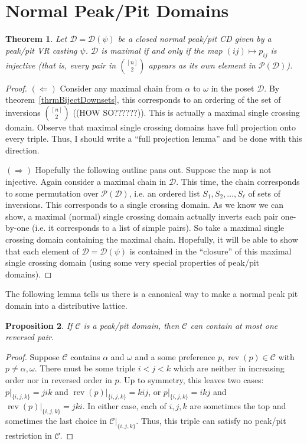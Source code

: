 \documentclass[12pt]{article}
\newtheorem{theorem}{Theorem}
\newtheorem{proposition}[theorem]{Proposition}
\newcommand{\C}{\mathcal{C}}
\newcommand{\D}{\mathcal{D}}
\newcommand{\PP}{\mathcal{P}}
\DeclareMathOperator*{\rev}{rev}
\newcommand{\1}[1]{\mathds{1}[{#1}]}
\begin{document}
\section{Normal Peak/Pit Domains}
  \begin{theorem}
    Let $\D = \D(\psi)$ be a closed normal peak/pit CD
    given by a peak/pit VR casting $\psi$.
    $\D$ is maximal if and only if the map $(ij)\mapsto p_{ij}$
    is injective (that is, every pair in $[n]\choose 2$ appears as
    its own element in $\PP(\D)$).
  \end{theorem}
  \begin{proof}
    $(\Longleftarrow)$ Consider any maximal chain from $\alpha$ to
    $\omega$ in the poset $\D$. By theorem~\ref{thrmBijectDownsets},
    this corresponds to an ordering of the set of inversions $[n]\choose 2$
    ((HOW SO??????)).
    This is actually a maximal single crossing domain.
    Observe that maximal single crossing domains have full projection onto every
    triple. Thus, I should write a ``full projection lemma'' and be done with
    this direction.

    $(\Longrightarrow)$
    Hopefully the following outline pans out.
    Suppose the map is not injective.
    Again consider a maximal chain in $\D$. This time, the chain corresponds to
    some permutation over $\PP(\D)$, i.e. an ordered list 
    $S_1,S_2,\ldots,S_\ell$ of sets of inversions.
    This corresponds to a single crossing domain.
    As we know we can show, a maximal (normal) single crossing domain actually
    inverts each pair one-by-one (i.e. it corresponds to a list of simple pairs). 
    So take a maximal single crossing domain containing the maximal chain.
    Hopefully, it will be able to show that each element of $\D = \D(\psi)$
    is contained in the ``closure'' of this maximal single crossing domain
    (using some very special properties of peak/pit domains).

  \end{proof}

  The following lemma tells us there is a canonical way to make a normal peak
  pit domain into a distributive lattice.
  \begin{proposition}
    If $\C$ is a peak/pit domain, then $\C$ can contain at most one reversed
    pair.
  \end{proposition}
  \begin{proof}
    Suppose $\C$ contains $\alpha$ and $\omega$ and a some preference 
    $p, \rev(p)\in \C$ with $p\ne \alpha, \omega$.
    There must be some triple $i<j<k$ which are neither in increasing order nor
    in reversed order in $p$.
    Up to symmetry, this leaves two cases: $p|_{\{i,j,k\}} = jik$
    and $\rev(p)|_{\{i,j,k\}} = kij$,
    or  $p|_{\{i,j,k\}} = ikj$ and $\rev(p)|_{\{i,j,k\}} = jki$.
    In either case, each of $i,j,k$ are sometimes the top and sometimes
    the last choice in $\C|_{\{i,j,k\}}$.
    Thus, this triple can satisfy no peak/pit restriction in $\C$.
  \end{proof}
\end{document}
